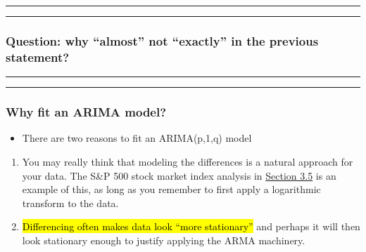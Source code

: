 \documentclass[]{article}
\providecommand{\tightlist}{%
  \setlength{\itemsep}{0pt}\setlength{\parskip}{0pt}}
\begin{document}
\begin{center}\rule{0.5\linewidth}{\linethickness}\end{center}

\begin{center}\rule{0.5\linewidth}{\linethickness}\end{center}

\subsubsection{\texorpdfstring{Question: why ``almost'' not ``exactly''
in the previous
statement?}{Question: why almost not exactly in the previous statement?}}\label{question-why-almost-not-exactly-in-the-previous-statement}


\begin{center}\rule{0.5\linewidth}{\linethickness}\end{center}

\begin{center}\rule{0.5\linewidth}{\linethickness}\end{center}

\subsubsection{Why fit an ARIMA model?}\label{why-fit-an-arima-model}

\begin{itemize}
\tightlist
\item
  There are two reasons to fit an ARIMA(p,1,q) model
\end{itemize}

\begin{enumerate}
\def\labelenumi{\arabic{enumi}.}
\item
  You may really think that modeling the differences is a natural
  approach for your data. The S\&P 500 stock market index analysis in
  \href{../03/notes03.html\#a-random-walk-model}{Section 3.5} is an
  example of this, as long as you remember to first apply a logarithmic
  transform to the data.
\item
  \hl{Differencing often makes data look ``more stationary''} and perhaps it
  will then look stationary enough to justify applying the ARMA
  machinery.
\end{enumerate}
\end{document}
